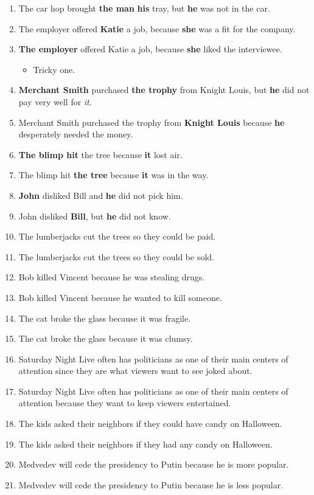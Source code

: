 \documentclass{article}
\begin{document}
\begin{enumerate}
	\item The car hop brought {\bf the man} {\bf his} tray, but {\bf he} was not in the car.
	\item The employer offered {\bf Katie} a job, because {\bf she} was a fit for the company.
	\item {\bf The employer} offered Katie a job, because {\bf she} liked the interviewee.
		\begin{itemize}
			\item Tricky one.
		\end{itemize}
	\item {\bf Merchant Smith} purchased {\bf the trophy} from Knight Louis, but {\bf he} did not pay very well for {\it it}.
	\item Merchant Smith purchased the trophy from {\bf Knight Louis} because {\bf he} desperately needed the money.
	\item {\bf The blimp hit} the tree because {\bf it} lost air.
	\item The blimp hit {\bf the tree} because {\bf it} was in the way.
	\item {\bf John} disliked Bill and {\bf he} did not pick him.
	\item John disliked {\bf Bill}, but {\bf he} did not know.
	\item The lumberjacks cut the trees so they could be paid.
	\item The lumberjacks cut the trees so they could be sold.
	\item Bob killed Vincent because he was stealing drugs.
	\item Bob killed Vincent because he wanted to kill someone.
	\item The cat broke the glass because it was fragile.
	\item The cat broke the glass because it was clumsy.
	\item Saturday Night Live often has politicians as one of their main centers of attention since they are what viewers want to see joked about.
	\item Saturday Night Live often has politicians as one of their main centers of attention because they want to keep viewers entertained.
	\item The kids asked their neighbors if they could have candy on Halloween.
	\item The kids asked their neighbors if they had any candy on Halloween.
	\item Medvedev will cede the presidency to Putin because he is more popular.
	\item Medvedev will cede the presidency to Putin because he is less popular.

\end{enumerate}
\end{document}
